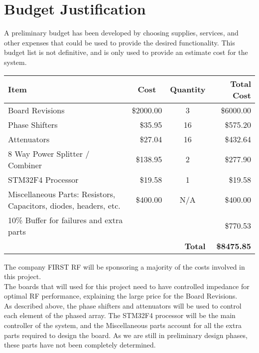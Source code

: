 \documentclass[UROP.tex]{subfiles}
\begin{document}
\bigskip
\section{\Large Budget Justification}
	A preliminary budget has been developed by choosing supplies, services, and other expenses that could be used to provide the desired functionality.  This budget list is not definitive, and is only used to provide an estimate cost for the system.\\
\begin{table}[H]
\doublespacing
\centering
\begin{tabular}{| p{7cm} | r | c | r |}
\hline
  Item & \multicolumn{1}{|c|}{Cost} & Quantity & Total Cost \\\hline\hline
  Board Revisions & \$2000.00 & 3 & \$6000.00  \\
  Phase Shifters & \$35.95 & 16 & \$575.20\\
  Attenuators & \$27.04 & 16 & \$432.64 \\
  8 Way Power Splitter / Combiner & \$138.95 & 2 & \$277.90 \\
  STM32F4 Processor & \$19.58 & 1 & \$19.58\\
  Miscellaneous Parts: Resistors, Capacitors, diodes, headers, etc. & \$400.00 & N/A & \$400.00\\
  10\% Buffer for failures and extra parts & & &\$770.53\\\hline
  \multicolumn{3}{r}{\textbf{Total}} & \multicolumn{1}{r}{\textbf{\$8475.85}}
 
 \end{tabular}
\end{table}

The company FIRST RF will be sponsoring a majority of the costs involved in this project.\\

The boards that will used for this project need to have controlled impedance for optimal RF performance, explaining the large price for the Board Revisions.\\

As described above, the phase shifters and attenuators will be used to control each element of the phased array.  The STM32F4 processor will be the main controller of the system, and the Miscellaneous parts account for all the extra parts required to design the board.  As we are still in preliminary design phases, these parts have not been completely determined.
\end{document}
